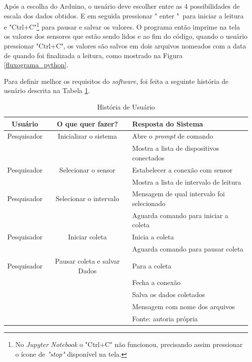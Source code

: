 		Após a escolha do Arduino, o usuário deve escolher entre as 4 possibilidades de escala dos dados obtidos. E em seguida pressionar " enter "\ para iniciar a leitura e "Ctrl+C"\footnote{No \textit{Jupyter Notebook} o "Ctrl+C" não funcionou, precisando assim pressionar o ícone de \textit{"stop"} disponível na tela.} para pausar e salvar os valores. O programa então imprime na tela os valores dos sensores que estão sendo lidos e ao fim do código, quando o usuário pressionar "Ctrl+C", os valores são salvos em dois arquivos nomeados com a data de quando foi finalizada a leitura, como mostrado na Figura \ref{fluxograma_python}.
		
		Para definir melhor os requisitos do \textit{software}, foi feita a seguinte história de usuário descrita na Tabela \ref{User_story}.
		
			\begin{table}[h] \footnotesize
			\centering
			\caption{História de Usuário}
			\label{User_story}
			
			\begin{tabular}{ccl}
				\toprule
				\textbf{Usuário} & \textbf{O que quer fazer?} & \textbf{Resposta do Sistema} \\
				\midrule
				Pesquisador & Inicializar o sistema &  Abre o \textit{prompt} de comando \\
				 & & Mostra a lista de dispositivos conectados \\
				Pesquisador & Selecionar o sensor & Estabelecer a conexão com sensor \\
				& & Mostra a lista de intervalo de leitura\\
				Pesquisador & Selecionar o intervalo & Mensagem de qual intervalo foi selecionado\\
				& & Aguarda comando para iniciar a coleta\\
				Pesquisador & Iniciar coleta & Inicia a coleta\\
				& &  Aguarda comando para pausar coleta\\
				Pesquisador & Pausar coleta e salvar Dados & Para a coleta\\
				& & Fecha a conexão\\
				& & Salva os dados coletados\\
				& & Mensagem com nome dos arquivos\\  
 				
				\bottomrule
				 & & Fonte: autoria própria
			\end{tabular}
		\end{table}
		
